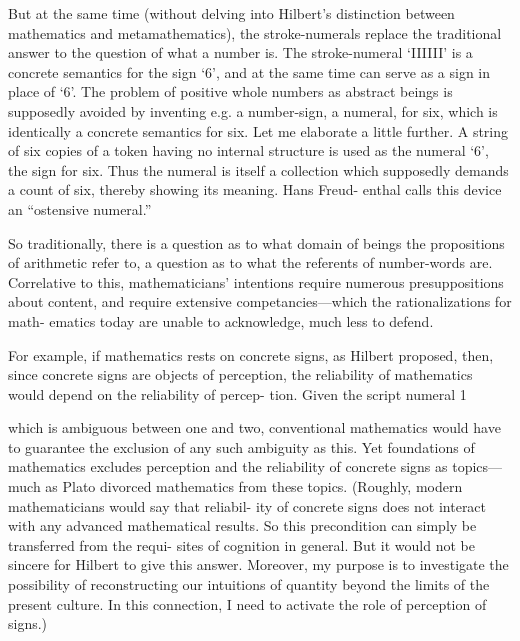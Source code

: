 But at the same time (without delving into Hilbert’s distinction 
between mathematics and metamathematics), the stroke-numerals 
replace the traditional answer to the question of what a number is. The 
stroke-numeral ‘IIIIII’ is a concrete semantics for the sign ‘6’, and at the 
same time can serve as a sign in place of ‘6’. The problem of positive 
whole numbers as abstract beings is supposedly avoided by inventing 
e.g. a number-sign, a numeral, for six, which is identically a concrete 
semantics for six. Let me elaborate a little further. A string of six copies 
of a token having no internal structure is used as the numeral ‘6’, the 
sign for six. Thus the numeral is itself a collection which supposedly 
demands a count of six, thereby showing its meaning. Hans Freud- 
enthal calls this device an “ostensive numeral.” 

So traditionally, there is a question as to what domain of beings 
the propositions of arithmetic refer to, a question as to what the 
referents of number-words are. Correlative to this, mathematicians’ 
intentions require numerous presuppositions about content, and 
require extensive competancies—which the rationalizations for math- 
ematics today are unable to acknowledge, much less to defend. 

For example, if mathematics rests on concrete signs, as Hilbert 
proposed, then, since concrete signs are objects of perception, the 
reliability of mathematics would depend on the reliability of percep- 
tion. Given the script numeral 1 


which is ambiguous between one and two, conventional mathematics 
would have to guarantee the exclusion of any such ambiguity as this. 
Yet foundations of mathematics excludes perception and the reliability 
of concrete signs as topics—much as Plato divorced mathematics from 
these topics. (Roughly, modern mathematicians would say that reliabil- 
ity of concrete signs does not interact with any advanced mathematical 
results. So this precondition can simply be transferred from the requi- 
sites of cognition in general. But it would not be sincere for Hilbert to 
give this answer. Moreover, my purpose is to investigate the possibility 
of reconstructing our intuitions of quantity beyond the limits of the 
present culture. In this connection, I need to activate the role of 
perception of signs.) 

